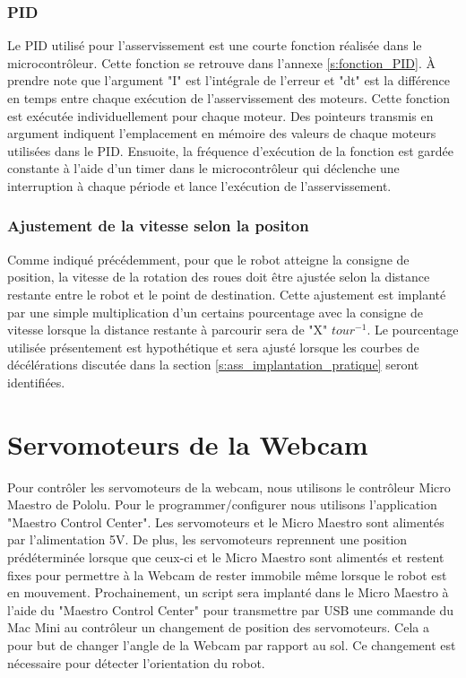 \subsubsection{PID}
Le PID utilisé pour l'asservissement est une courte fonction réalisée dans le microcontrôleur. Cette fonction se retrouve dans l'annexe \ref{s:fonction_PID}. À prendre note que l'argument "I" est l'intégrale de l'erreur et "dt" est la différence en temps entre chaque exécution de l'asservissement des moteurs. Cette fonction est exécutée individuellement pour chaque moteur. Des pointeurs transmis en argument indiquent l'emplacement en mémoire des valeurs de chaque moteurs utilisées dans le PID. Ensuoite, la fréquence d'exécution de la fonction est gardée constante à l'aide d'un timer dans le microcontrôleur qui déclenche une interruption à chaque période et lance l'exécution de l'asservissement.
\subsubsection{Ajustement de la vitesse selon la positon}
Comme indiqué précédemment, pour que le robot atteigne la consigne de position, la vitesse de la rotation des roues doit être ajustée selon la distance restante entre le robot et le point de destination. Cette ajustement est implanté par une simple multiplication d'un certains pourcentage avec la consigne de vitesse lorsque la distance restante à parcourir sera de "X" $tour^{-1}$. Le pourcentage utilisée présentement est hypothétique et sera ajusté lorsque les courbes de décélérations discutée dans la section \ref{s:ass_implantation_pratique} seront identifiées.

\section{Servomoteurs de la Webcam}
Pour contrôler les servomoteurs de la webcam, nous utilisons le contrôleur Micro Maestro de Pololu. Pour le programmer/configurer nous utilisons l'application "Maestro Control Center". Les servomoteurs et le Micro Maestro sont alimentés par l'alimentation 5V. De plus, les servomoteurs reprennent une position prédéterminée lorsque que ceux-ci et le Micro Maestro sont alimentés et restent fixes pour permettre à la Webcam de rester immobile même lorsque le robot est en mouvement. Prochainement, un script sera implanté dans le Micro Maestro à l'aide du "Maestro Control Center" pour transmettre par USB une commande du Mac Mini au contrôleur un changement de position des servomoteurs. Cela a pour but de changer l'angle de la Webcam par rapport au sol. Ce changement est nécessaire pour détecter l'orientation du robot.


